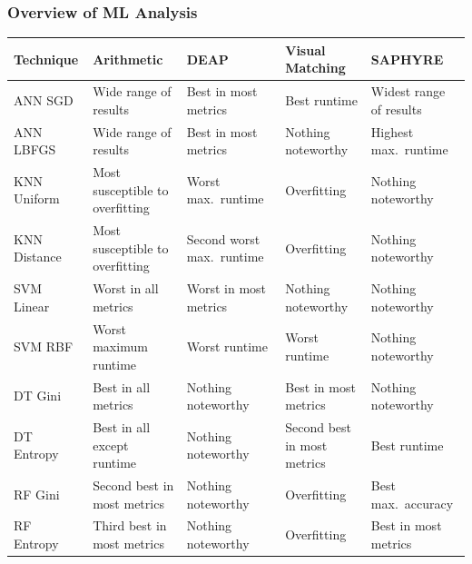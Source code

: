 \documentclass{beamer}
\begin{document}
\begin{frame}
\frametitle{Overview of ML Analysis}
\begin{table}[!t]
\renewcommand{\arraystretch}{1.3}
\centering
\resizebox{\textwidth}{!}
{\begin{tabular}{*{5}{l}}
\toprule
Technique & Arithmetic & DEAP & Visual Matching & SAPHYRE \\ \midrule
ANN SGD & Wide range of results & Best in most metrics & Best runtime & Widest range of results \\
ANN LBFGS & Wide range of results & Best in most metrics & Nothing noteworthy & Highest max.~runtime \\
KNN Uniform & Most susceptible to overfitting & Worst max.~runtime & Overfitting & Nothing noteworthy \\
KNN Distance & Most susceptible to overfitting & Second worst max.~runtime & Overfitting & Nothing noteworthy \\
SVM Linear & Worst in all metrics & Worst in most metrics & Nothing noteworthy & Nothing noteworthy \\
SVM RBF & Worst maximum runtime & Worst runtime & Worst runtime & Nothing noteworthy \\
DT Gini & Best in all metrics & Nothing noteworthy & Best in most metrics & Nothing noteworthy \\
DT Entropy & Best in all except runtime & Nothing noteworthy & Second best in most metrics & Best runtime \\
RF Gini & Second best in most metrics & Nothing noteworthy & Overfitting & Best max.~accuracy \\
RF Entropy & Third best in most metrics & Nothing noteworthy & Overfitting & Best in most metrics \\ \bottomrule
\end{tabular}}
\end{table}
\end{frame}
\end{document}
